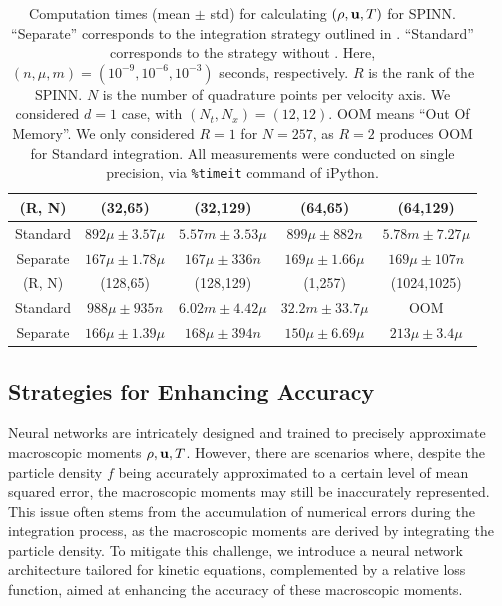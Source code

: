 \documentclass[preprint,12pt]{elsarticle}
\begin{document}
\begin{table}
    \centering
    \begin{tabular}{|c|c|c|c|c|}
    \hline
        (R, N) & (32,65) & (32,129) & (64,65) & (64,129) \\ \hline
        Standard & $892\mu \pm 3.57\mu$ & $5.57m \pm 3.53\mu$ & $899\mu \pm 882n$ & $5.78m \pm 7.27\mu$ \\
        Separate & $167\mu \pm 1.78\mu$ & $167\mu \pm 336n$ & $169\mu \pm 1.66\mu$ & $169\mu \pm 107n$ \\
    \hline \hline
        (R, N) & (128,65) & (128,129) & (1,257) & (1024,1025)\\ \hline
        Standard & $988\mu \pm 935n$ & $6.02m \pm 4.42\mu$ & $32.2m \pm 33.7\mu$ & OOM\\
        Separate & $166\mu \pm 1.39\mu$ & $168\mu \pm 394n$ & $150\mu \pm 6.69\mu$ & $213\mu \pm 3.4\mu$\\
    \hline
    \end{tabular}
    \caption{
    Computation times (mean $\pm$ std) for calculating $(\rho, {\bf u}, T)$ for SPINN.
    ``Separate'' corresponds to the integration strategy outlined in .
    ``Standard'' corresponds to the strategy without .
    Here, $(n, \mu, m) = (10^{-9}, 10^{-6}, 10^{-3})$ seconds, respectively.
    $R$ is the rank of the SPINN.
    $N$ is the number of quadrature points per velocity axis.
    We considered $d=1$ case, with $(N_t, N_x) = (12, 12)$.
    OOM means ``Out Of Memory''.
    We only considered $R=1$ for $N=257$, as $R=2$ produces OOM for Standard integration.
    All measurements were conducted on single precision, via \texttt{\%timeit} command of iPython.
    }
    \label{tab:integral_speed}
\end{table}



\subsection{Strategies for Enhancing Accuracy}
Neural networks are intricately designed and trained to precisely approximate macroscopic moments $\rho, {\bf u}, T$. However, there are scenarios where, despite the particle density $f$ being accurately approximated to a certain level of mean squared error, the macroscopic moments may still be inaccurately represented.
This issue often stems from the accumulation of numerical errors during the integration process, as the macroscopic moments are derived by integrating the particle density.
To mitigate this challenge, we introduce a neural network architecture tailored for kinetic equations, complemented by a relative loss function, aimed at enhancing the accuracy of these macroscopic moments.
\end{document}
